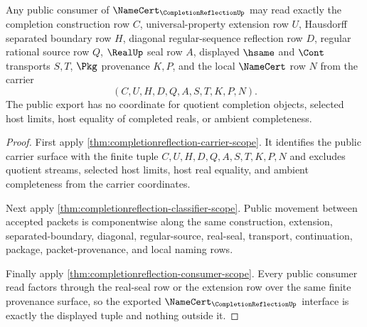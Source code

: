 \begin{theorem}
\label{thm:completionreflection-public-export}
Any public consumer of $\NameCert_{\CompletionReflectionUp}$ may read exactly the completion construction row $C$, universal-property extension row $U$, Hausdorff separated boundary row $H$, diagonal regular-sequence reflection row $D$, regular rational source row $Q$, $\RealUp$ seal row $A$, displayed $\hsame$ and $\Cont$ transports $S,T$, $\Pkg$ provenance $K,P$, and the local $\NameCert$ row $N$ from the carrier
$$
(C,U,H,D,Q,A,S,T,K,P,N).
$$
The public export has no coordinate for quotient completion objects, selected host limits, host equality of completed reals, or ambient completeness.
\end{theorem}
\begin{proof}
First apply \autoref{thm:completionreflection-carrier-scope}. It identifies the public carrier surface with the finite tuple $C,U,H,D,Q,A,S,T,K,P,N$ and excludes quotient streams, selected host limits, host real equality, and ambient completeness from the carrier coordinates.

Next apply \autoref{thm:completionreflection-classifier-scope}. Public movement between accepted packets is componentwise along the same construction, extension, separated-boundary, diagonal, regular-source, real-seal, transport, continuation, package, packet-provenance, and local naming rows.

Finally apply \autoref{thm:completionreflection-consumer-scope}. Every public consumer read factors through the real-seal row or the extension row over the same finite provenance surface, so the exported $\NameCert_{\CompletionReflectionUp}$ interface is exactly the displayed tuple and nothing outside it.
\end{proof}

